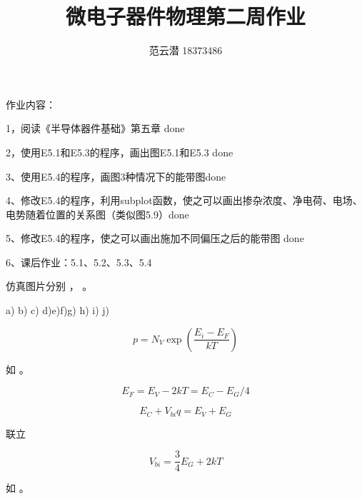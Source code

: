 \documentclass[lang=cn,11pt,a4paper,cite=authoryear]{elegantpaper}
\title{微电子器件物理\quad 第二周作业}
\author{范云潜 18373486}
\institute{微电子学院 184111 班}
\date{\zhtoday}
\begin{document}
\maketitle

作业内容：

1，阅读《半导体器件基础》第五章 done

2，使用E5.1和E5.3的程序，画出图E5.1和E5.3 done

3、使用E5.4的程序，画图3种情况下的能带图done

4、修改E5.4的程序，利用subplot函数，使之可以画出掺杂浓度、净电荷、电场、电势随着位置的关系图（类似图5.9）done

5、修改E5.4的程序，使之可以画出施加不同偏压之后的能带图 done

6、课后作业：5.1、5.2、5.3、5.4

\tableofcontents



仿真图片分别 ， 。











a) \XSolidBrush %
 b) \Checkmark c) \XSolidBrush d)\Checkmark e)\Checkmark f)\XSolidBrush g) \Checkmark h) \Checkmark i) \XSolidBrush j) \Checkmark 



\[p = N_V \exp(\frac{E_i-E_F}{kT})\]

如  。


\[E_F = E_V - 2 k T = E_C - E_G / 4\]

\[E_C + V_{bi} q = E_V + E_G\]

联立

\[V_{bi} = \frac{3}{4}E_G + 2 k T\]




如  。
\end{document}
